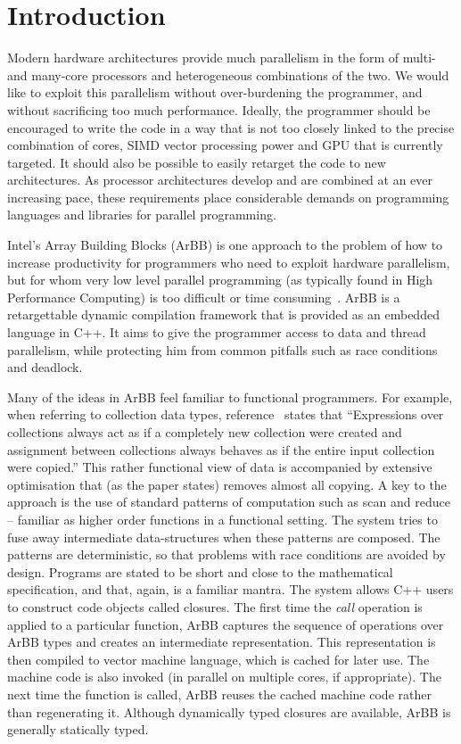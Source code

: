 
\section{Introduction} 

Modern hardware architectures provide much parallelism in the form of
multi- and many-core processors and heterogeneous combinations of the two.
We would like to exploit this parallelism without over-burdening the programmer, and without sacrificing too much performance.
Ideally, the programmer should be encouraged to write the code in a way that is not too closely linked to the precise combination of cores, SIMD vector processing power and GPU
that is currently targeted.
It should also be possible to easily retarget the code to new architectures.
As processor architectures develop and are combined at an ever increasing pace, these requirements place considerable demands on programming languages
and libraries for parallel programming.

Intel's Array Building Blocks (ArBB) is one approach to the problem of how to increase productivity for programmers who need to exploit hardware parallelism, but for whom very low level parallel programming (as typically found in High Performance Computing) is too difficult or time consuming~\cite{ARBB2011}. ArBB is a retargettable dynamic compilation framework that is provided as an embedded language in C++. It aims to give the programmer access to data and thread parallelism, while protecting him from common pitfalls such as race conditions and deadlock.

Many of the ideas in ArBB feel familiar to functional programmers.
For example, when referring to collection data types, reference~\cite{ARBB2011} states that ``Expressions over collections always act as if a completely new collection were created and assignment between collections always behaves as if the entire input collection were copied.''
This rather functional view of data is accompanied by extensive optimisation that (as the paper states) removes almost all copying.
A key to the approach is the use of standard patterns of computation such as scan and reduce -- familiar as higher order functions in a functional setting.
The system tries to fuse away intermediate data-structures
when these patterns are composed.
The patterns are deterministic, so that problems with race conditions are avoided by design. Programs are stated to be short and close to the mathematical specification, and that, again, is a familiar mantra. The system allows C++ users to construct code objects called closures.
The first time the {\em call} operation is applied to
a particular function, ArBB captures the sequence of operations
over ArBB types and creates an intermediate representation. 
This representation is then compiled to
vector machine language, which is
cached for later use.  The
machine code is also invoked (in parallel on multiple
cores, if appropriate). The next time the function
is called, ArBB reuses the cached machine
code rather than regenerating it.
Although dynamically typed closures are available, ArBB is generally
statically typed.




